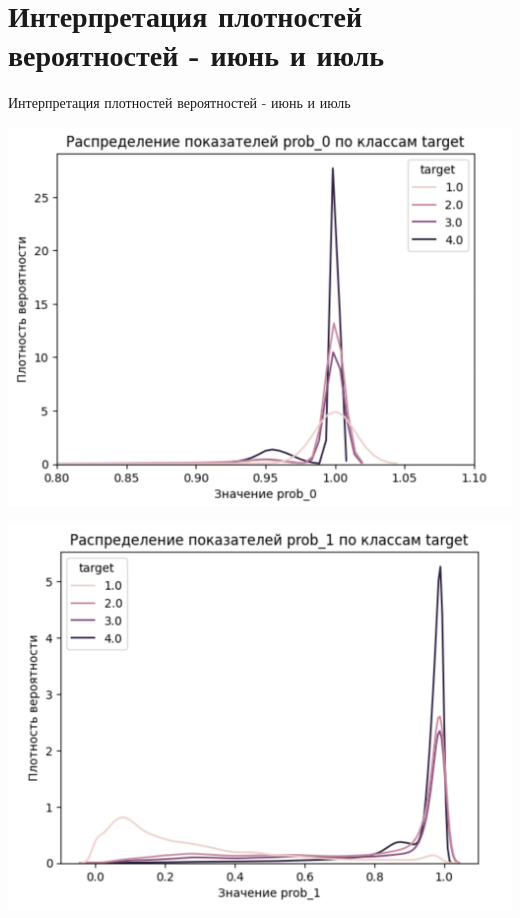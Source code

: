 \documentclass[10pt,pdf,hyperref={unicode}]{beamer}
\begin{document}
\section{Интерпретация плотностей вероятностей - июнь и июль}
\begin{frame}{Интерпретация плотностей вероятностей - июнь и июль}

	
	\centering
\begin{minipage}{0.48\textwidth}
	\centering
	\includegraphics[width=\linewidth]{../figures/prob_0_our.png}
\end{minipage}
\hfill
\begin{minipage}{0.48\textwidth}
	\centering
	\includegraphics[width=\linewidth]{../figures/prob_1_our.png}
\end{minipage}



\end{frame}
\end{document}
